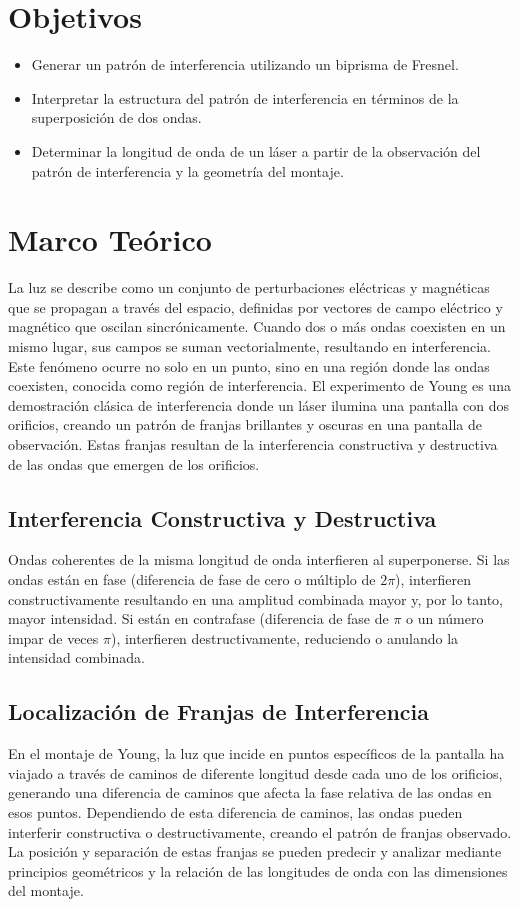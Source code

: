 \section{Objetivos}
\begin{itemize}
    \item Generar un patrón de interferencia utilizando un biprisma de Fresnel.
    \item Interpretar la estructura del patrón de interferencia en términos de la superposición de dos ondas.
    \item Determinar la longitud de onda de un láser a partir de la observación del patrón de interferencia y la geometría del montaje.
\end{itemize}

\section{Marco Teórico}
La luz se describe como un conjunto de perturbaciones eléctricas y magnéticas que se propagan a través del espacio, definidas por vectores de campo eléctrico y magnético que oscilan sincrónicamente. Cuando dos o más ondas coexisten en un mismo lugar, sus campos se suman vectorialmente, resultando en interferencia. Este fenómeno ocurre no solo en un punto, sino en una región donde las ondas coexisten, conocida como región de interferencia. El experimento de Young es una demostración clásica de interferencia donde un láser ilumina una pantalla con dos orificios, creando un patrón de franjas brillantes y oscuras en una pantalla de observación. Estas franjas resultan de la interferencia constructiva y destructiva de las ondas que emergen de los orificios.

\subsection{Interferencia Constructiva y Destructiva}
Ondas coherentes de la misma longitud de onda interfieren al superponerse. Si las ondas están en fase (diferencia de fase de cero o múltiplo de \(2\pi\)), interfieren constructivamente resultando en una amplitud combinada mayor y, por lo tanto, mayor intensidad. Si están en contrafase (diferencia de fase de \(\pi\) o un número impar de veces \(\pi\)), interfieren destructivamente, reduciendo o anulando la intensidad combinada.

\subsection{Localización de Franjas de Interferencia}
En el montaje de Young, la luz que incide en puntos específicos de la pantalla ha viajado a través de caminos de diferente longitud desde cada uno de los orificios, generando una diferencia de caminos que afecta la fase relativa de las ondas en esos puntos. Dependiendo de esta diferencia de caminos, las ondas pueden interferir constructiva o destructivamente, creando el patrón de franjas observado. La posición y separación de estas franjas se pueden predecir y analizar mediante principios geométricos y la relación de las longitudes de onda con las dimensiones del montaje.

